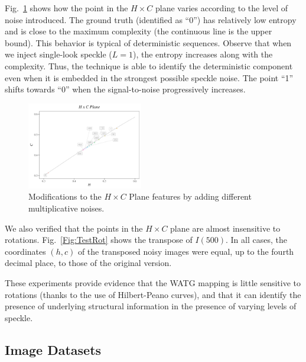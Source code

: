 \documentclass[journal]{IEEEtran}
\begin{document}
Fig.~\ref{Fig:TestSpeckleHC} shows how the point in the $H\times C$ plane varies according to the level of noise introduced.
The ground truth (identified as ``\textsf{0}'') has relatively low entropy and is close to the maximum complexity (the continuous line is the upper bound).
This behavior is typical of deterministic sequences.
Observe that when we inject single-look speckle ($L=1$), the entropy increases along with the complexity.
Thus, the technique is able to identify the deterministic component even when it is embedded in the strongest possible speckle noise.
The point ``\textsf{1}'' shifts towards ``\textsf{0}'' when the signal-to-noise progressively increases.

\begin{figure}
	\includegraphics[width=0.45\textwidth]{Figures/waves1.pdf}
	\caption{Modifications to the $H \times C$ Plane features by adding different multiplicative noises.}
	\label{Fig:TestSpeckleHC}
\end{figure}

We also verified that the points in the $H\times C$ plane are almost insensitive to rotations.
Fig.~\ref{Fig:TestRot} shows the transpose of $I(500)$.
In all cases, the coordinates $(h,c)$ of the transposed noisy images were equal, up to the fourth decimal place, to those of the original version.

These experiments provide evidence that the WATG mapping is little sensitive to rotations (thanks to the use of Hilbert-Peano curves), and that it can identify the presence of underlying structural information in the presence of varying levels of speckle.

\subsection{Image Datasets}
\end{document}
